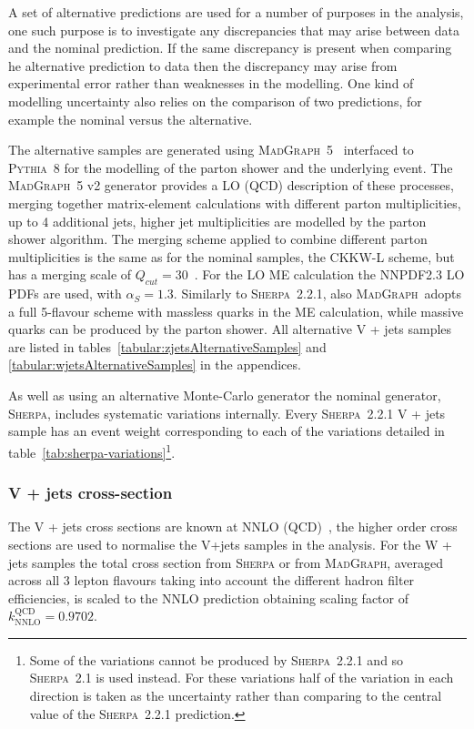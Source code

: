 A set of alternative predictions are used for a number of purposes in the
analysis, one such purpose is to investigate any discrepancies that may arise
between data and the nominal prediction. If the same discrepancy is present when
comparing he alternative prediction to data then the discrepancy may arise from
experimental error rather than weaknesses in the modelling. One kind of
modelling uncertainty also relies on the comparison of two predictions, for
example the nominal versus the alternative.

The alternative samples are generated using
\textsc{MadGraph}~5~\cite{MADGRAPH5_aMC@NLO} interfaced to \textsc{Pythia}~8 for
the modelling of the parton shower and the underlying event. The
\textsc{MadGraph}~5 v2 generator provides a LO (QCD) description of these
processes, merging together matrix-element calculations with different parton
multiplicities, up to 4 additional jets, higher jet multiplicities are modelled
by the parton shower algorithm. The merging scheme applied to combine different
parton multiplicities is the same as for the nominal samples, the CKKW-L scheme,
but has a merging scale of $Q_{cut} = 30$~\GeV. For the LO ME calculation the
NNPDF2.3 LO PDFs are used, with $\alpha_S = 1.3$.  Similarly to
\textsc{Sherpa}~2.2.1, also \textsc{MadGraph}~adopts a full 5-flavour scheme
with massless quarks in the ME calculation, while massive quarks can be produced
by the parton shower. All alternative V + jets samples are listed in
tables~\ref{tabular:zjetsAlternativeSamples} and
\ref{tabular:wjetsAlternativeSamples} in the appendices.

As well as using an alternative Monte-Carlo generator the nominal generator,
\textsc{Sherpa}, includes systematic variations internally. Every
\textsc{Sherpa}~2.2.1 V + jets sample has an event weight corresponding to each
of the variations detailed in table~\ref{tab:sherpa-variations}\footnote{Some of
the variations cannot be produced by \textsc{Sherpa}~2.2.1 and so
\textsc{Sherpa}~2.1 is used instead. For these variations half of the variation
in each direction is taken as the uncertainty rather than comparing to the
central value of the \textsc{Sherpa}~2.2.1 prediction.}.


\subsubsection{V + jets cross-section}
The V + jets cross sections are known at NNLO (QCD)~\cite{Butterworth:1287902},
the higher order cross sections are used to normalise the V+jets samples in the
analysis. For the W + jets samples the total cross section from \textsc{Sherpa} or
from \textsc{MadGraph}, averaged across all 3 lepton flavours taking into account the
different hadron filter efficiencies, is scaled to the NNLO prediction obtaining
scaling factor of $k_{\text{NNLO}}^{\text{QCD}} = 0.9702$.

